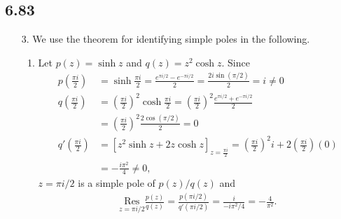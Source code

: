\documentclass[a4paper,12pt]{article}
\begin{document}
\subsection*{6.83}
\begin{enumerate}
    \item[3.]
        We use the theorem for identifying simple poles in the following.
        \begin{enumerate}
            \item
                Let $p(z) = \sinh z$ and $q(z) = z^2 \cosh z$. Since
                \begin{align*}
                    p \left( \frac{\pi i}{2} \right) &= \sinh \frac{\pi i}{2} = \frac{e^{\pi i/2} - e^{-\pi i/2}}{2} = \frac{2i \sin (\pi/2)}{2} = i \neq 0 \\
                    q \left( \frac{\pi i}{2} \right) &= \left( \frac{\pi i}{2} \right)^2 \cosh \frac{\pi i}{2} = \left( \frac{\pi i}{2} \right)^2 \frac{e^{\pi i/2} + e^{-\pi i/2}}{2} \\
                    &= \left( \frac{\pi i}{2} \right)^2 \frac{2\cos(\pi/2)}{2} = 0 \\
                    q' \left( \frac{\pi i}{2} \right) &= [z^2 \sinh z + 2z \cosh z]_{z = \frac{\pi i}{2}} = \left( \frac{\pi i}{2} \right)^2 i + 2 \left( \frac{\pi i}{2} \right) (0) \\
                    &= -\frac{i\pi^2}{4} \neq 0,
                \end{align*}
                $z = \pi i/2$ is a simple pole of $p(z) / q(z)$ and
                \begin{align*}
                    \underset{z = \pi i/2}{\text{\ Res\ }} \frac{p(z)}{q(z)} = \frac{p(\pi i/2)}{q'(\pi i/2)} = \frac{i}{-i\pi^2 / 4} = -\frac{4}{\pi^2}.
                \end{align*}


\end{enumerate}
\end{enumerate}
\end{document}
